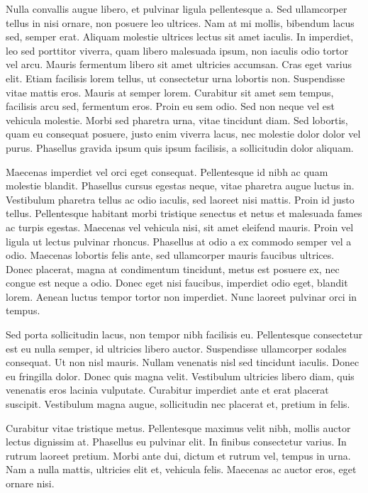 \documentclass{article}
\begin{document}
 Nulla convallis augue libero, et pulvinar ligula pellentesque a. Sed ullamcorper tellus in nisi ornare, non posuere leo ultrices. Nam at mi mollis, bibendum lacus sed, semper erat. Aliquam molestie ultrices lectus sit amet iaculis. In imperdiet, leo sed porttitor viverra, quam libero malesuada ipsum, non iaculis odio tortor vel arcu. Mauris fermentum libero sit amet ultricies accumsan. Cras eget varius elit. Etiam facilisis lorem tellus, ut consectetur urna lobortis non. Suspendisse vitae mattis eros. Mauris at semper lorem. Curabitur sit amet sem tempus, facilisis arcu sed, fermentum eros. Proin eu sem odio. Sed non neque vel est vehicula molestie. Morbi sed pharetra urna, vitae tincidunt diam. Sed lobortis, quam eu consequat posuere, justo enim viverra lacus, nec molestie dolor dolor vel purus. Phasellus gravida ipsum quis ipsum facilisis, a sollicitudin dolor aliquam. 



 Maecenas imperdiet vel orci eget consequat. Pellentesque id nibh ac quam molestie blandit. Phasellus cursus egestas neque, vitae pharetra augue luctus in. Vestibulum pharetra tellus ac odio iaculis, sed laoreet nisi mattis. Proin id justo tellus. Pellentesque habitant morbi tristique senectus et netus et malesuada fames ac turpis egestas. Maecenas vel vehicula nisi, sit amet eleifend mauris. Proin vel ligula ut lectus pulvinar rhoncus. Phasellus at odio a ex commodo semper vel a odio. Maecenas lobortis felis ante, sed ullamcorper mauris faucibus ultrices. Donec placerat, magna at condimentum tincidunt, metus est posuere ex, nec congue est neque a odio. Donec eget nisi faucibus, imperdiet odio eget, blandit lorem. Aenean luctus tempor tortor non imperdiet. Nunc laoreet pulvinar orci in tempus. 



 Sed porta sollicitudin lacus, non tempor nibh facilisis eu. Pellentesque consectetur est eu nulla semper, id ultricies libero auctor. Suspendisse ullamcorper sodales consequat. Ut non nisl mauris. Nullam venenatis nisl sed tincidunt iaculis. Donec eu fringilla dolor. Donec quis magna velit. Vestibulum ultricies libero diam, quis venenatis eros lacinia vulputate. Curabitur imperdiet ante et erat placerat suscipit. Vestibulum magna augue, sollicitudin nec placerat et, pretium in felis. 



 Curabitur vitae tristique metus. Pellentesque maximus velit nibh, mollis auctor lectus dignissim at. Phasellus eu pulvinar elit. In finibus consectetur varius. In rutrum laoreet pretium. Morbi ante dui, dictum et rutrum vel, tempus in urna. Nam a nulla mattis, ultricies elit et, vehicula felis. Maecenas ac auctor eros, eget ornare nisi. 
\end{document}

